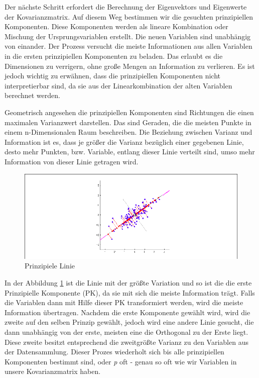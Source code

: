 Der nächste Schritt erfordert die Berechnung der Eigenvektors und Eigenwerte der Kovarianzmatrix. Auf diesem Weg bestimmen wir die gesuchten prinzipiellen Komponenten. Diese Komponenten werden als lineare Kombination oder Mischung der Ursprungsvariablen erstellt. Die neuen Variablen sind unabhängig von einander. Der Prozess versucht die meiste Informationen aus allen Variablen in die ersten prinzipiellen Komponenten zu beladen. Das erlaubt es die Dimensionen zu verrigern, ohne große Mengen an Information zu verlieren. Es ist jedoch wichtig zu erwähnen, dass die prinzipiellen Komponenten nicht interpretierbar sind, da sie aus der Linearkombination der alten Variablen berechnet werden.

Geometrisch angesehen die prinzipiellen Komponenten sind Richtungen die einen maximalen Varianzwert darstellen. Das sind Geraden, die die meisten Punkte in einem n-Dimensionalen Raum beschreiben. Die Beziehung zwischen Varianz und Information ist es, dass je größer die Varianz bezüglich einer gegebenen Linie, desto mehr Punkten, bzw. Variable, entlang dieser Linie verteilt sind, umso mehr Information von dieser Linie getragen wird. 

	\begin{figure}
		\centering
		\includegraphics[scale=0.5]{images/PCA_L.png}
		\caption{Prinzipiele Linie}
		\label{PL}
\end{figure}

In der Abbildung \ref{PL} ist die Linie mit der größte Variation und so ist die die erste Prinzipielle Komponente (PK), da sie mit sich die meiste Information trägt. Falls die Variablen dann mit Hilfe dieser PK transformiert werden, wird die meiste Information übertragen. Nachdem die erste Komponente gewählt wird, wird die zweite auf den selben Prinzip gewählt, jedoch wird eine andere Linie gesucht, die dann unabhängig von der erste, meisten eine die Orthogonal zu der Erste liegt. Diese zweite besitzt entsprechend die zweitgrößte Varianz zu den Variablen aus der Datensammlung. Dieser Prozes wiederholt sich bis alle prinzipiellen Komponenten bestimmt sind, oder \emph{p} oft -  genau so oft wie wir Variablen in unsere Kovarianzmatrix haben.

